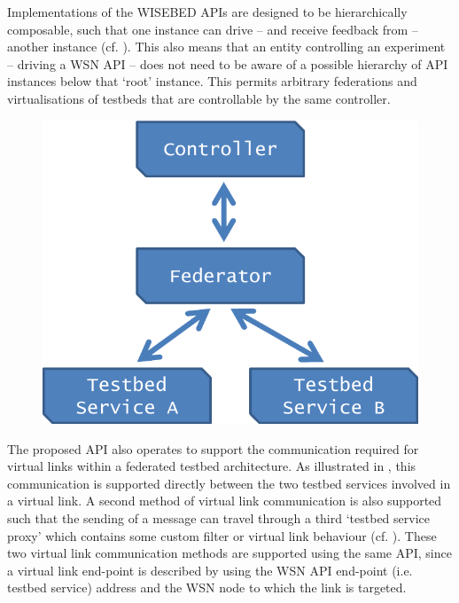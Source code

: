 Implementations of the WISEBED APIs are designed to be hierarchically composable, such that one instance can drive -- and receive feedback from -- another instance (cf. ). This also means that an entity controlling an experiment -- driving a WSN API -- does not need to be aware of a possible hierarchy of API instances below that `root' instance. This permits arbitrary federations and virtualisations of testbeds that are controllable by the same controller.

	\begin{figure}[htb]
		\centering
		\includegraphics[width=0.5\columnwidth]{images/architecture2}
		\caption{}
		\label{fig:architecture2}
	\end{figure}

The proposed API also operates to support the communication required for virtual links within a federated testbed architecture. As illustrated in , this communication is supported directly between the two testbed services involved in a virtual link. A second method of virtual link communication is also supported such that the sending of a message can travel through a third `testbed service proxy' which contains some custom filter or virtual link behaviour (cf. ). These two virtual link communication methods are supported using the same API, since a virtual link end-point is described by using the WSN API end-point (i.e. testbed service) address and the WSN node to which the link is targeted.

